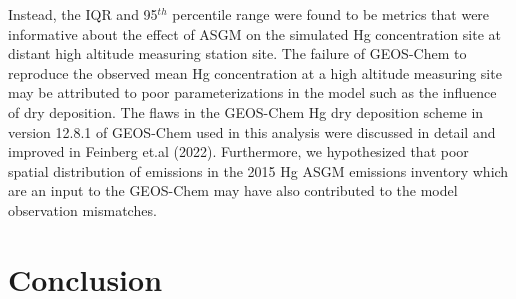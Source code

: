\begin{flushleft}
Instead, the IQR and 95$^{th}$ percentile range were found to be metrics that were informative about the effect of ASGM on the simulated Hg concentration site at distant high altitude measuring station site. The failure of GEOS-Chem to reproduce the observed mean Hg concentration at a high altitude measuring site may be attributed to poor parameterizations in the model such as the influence of dry deposition. The flaws in the GEOS-Chem Hg dry deposition scheme in version 12.8.1 of GEOS-Chem used in this analysis were discussed in detail and improved in Feinberg et.al (2022). Furthermore, we hypothesized that poor spatial distribution of emissions in the 2015 Hg ASGM emissions inventory which are an input to the GEOS-Chem may have also contributed to the model observation mismatches. 

\end{flushleft}






\section{Conclusion}

